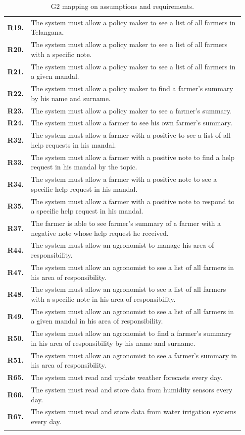 \begin{longtable}{p{0.07\linewidth} p{0.88\linewidth}}
	\textbf{R19.} & The system must allow a policy maker to see a list of all farmers in Telangana.\\
	\textbf{R20.} & The system must allow a policy maker to see a list of all farmers with a specific note.\\
	\textbf{R21.} & The system must allow a policy maker to see a list of all farmers in a given mandal.\\
	\textbf{R22.} & The system must allow a policy maker to find a farmer's summary by his name and surname.\\
	\textbf{R23.} & The system must allow a policy maker to see a farmer's summary.\\
	
	\textbf{R24.} & The system must allow a farmer to see his own farmer's summary.\\
	\textbf{R32.} & The system must allow a farmer with a positive  to see a list of all help requests in his mandal.\\
	\textbf{R33.} & The system must allow a farmer with a positive note to find a help request in his mandal by the topic.\\
	\textbf{R34.} & The system must allow a farmer with a positive note to see a specific help request in his mandal.\\
	\textbf{R35.} & The system must allow a farmer with a positive note to respond to a specific help request in his mandal.\\
	\textbf{R37.} & The farmer is able to see farmer's summary of a farmer with a negative note whose help request he received. \\

	\textbf{R44.} & The system must allow an agronomist to manage his area of responsibility.\\
	\textbf{R47.} & The system must allow an agronomist to see a list of all farmers in his area of responsibility.\\
	\textbf{R48.} & The system must allow an agronomist to see a list of all farmers with a specific note in his area of responsibility.\\
	\textbf{R49.} & The system must allow an agronomist to see a list of all farmers in a given mandal in his area of responsibility.\\
	\textbf{R50.} & The system must allow an agronomist to find a farmer's summary in his area of responsibility by his name and surname.\\
	\textbf{R51.} & The system must allow an agronomist to see a farmer's summary in his area of responsibility.\\

	\textbf{R65.} & The system must read and update weather forecasts every day. \\
	\textbf{R66.} & The system must read and store data from humidity sensors every day. \\
	\textbf{R67.} & The system must read and store data from water irrigation systems every day. \\
    \bottomrule
    \caption{G2 mapping on assumptions and requirements.}
\end{longtable}

